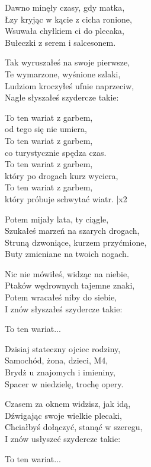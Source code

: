 \begin{text}
    Dawno minęły czasy, gdy matka,\\
    Łzy kryjąc w kącie z cicha ronione,\\
    Wsuwała chyłkiem ci do plecaka,\\
    Bułeczki z serem i salcesonem.

    Tak wyruszałeś na swoje pierwsze,\\
    Te wymarzone, wyśnione szlaki,\\
    Ludziom kroczyłeś ufnie naprzeciw,\\
    Nagle słyszałeś szydercze takie:

    \vin To ten wariat z garbem,\\
    \vin od tego się nie umiera,\\
    \vin To ten wariat z garbem,\\
    \vin co turystycznie spędza czas.\\
    \vin To ten wariat z garbem,\\
    \vin który po drogach kurz wyciera,\\
    \vin To ten wariat z garbem,\\
    \vin który próbuje schwytać wiatr. |x2

    Potem mijały lata, ty ciągle,\\
    Szukałeś marzeń na szarych drogach,\\
    Struną dzwoniące, kurzem przyćmione,\\
    Buty zmieniane na twoich nogach.

    Nic nie mówiłeś, widząc na niebie,\\
    Ptaków wędrownych tajemne znaki,\\
    Potem wracałeś niby do siebie,\\
    I znów słyszałeś szydercze takie:

    \vin To ten wariat...

    Dzisiaj stateczny ojciec rodziny,\\
    Samochód, żona, dzieci, M4,\\
    Brydż u znajomych i imieniny,\\
    Spacer w niedzielę, trochę opery.

    Czasem za oknem widzisz, jak idą,\\
    Dźwigając swoje wielkie plecaki,\\
    Chciałbyś dołączyć, stanąć w szeregu,\\
    I znów usłyszeć szydercze takie:

    \vin To ten wariat...
\end{text}
